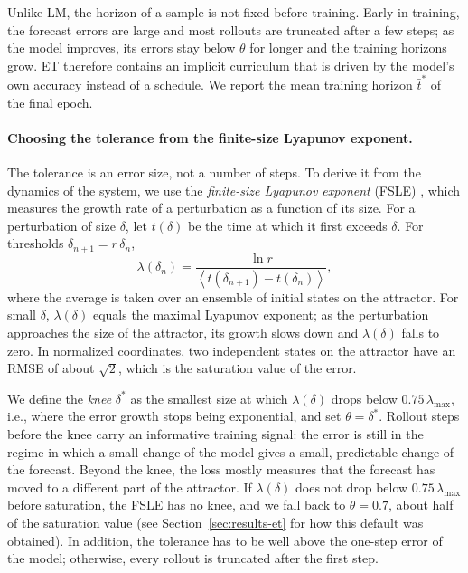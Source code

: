 \documentclass{article}
\begin{document}
Unlike LM, the horizon of a sample is not fixed before training. Early in training, the forecast errors are large and most rollouts are truncated after a few steps; as the model improves, its errors stay below $\theta$ for longer and the training horizons grow. ET therefore contains an implicit curriculum that is driven by the model's own accuracy instead of a schedule. We report the mean training horizon $\bar t^*$ of the final epoch.

\paragraph{Choosing the tolerance from the finite-size Lyapunov exponent.}
The tolerance is an error size, not a number of steps. To derive it from the dynamics of the system, we use the \emph{finite-size Lyapunov exponent} (FSLE) \cite{aurell_predictability_1997}, which measures the growth rate of a perturbation as a function of its size. For a perturbation of size $\delta$, let $t(\delta)$ be the time at which it first exceeds $\delta$. For thresholds $\delta_{n+1} = r\,\delta_n$,
\[
\lambda(\delta_n) = \frac{\ln r}{\left\langle t(\delta_{n+1}) - t(\delta_n) \right\rangle},
\]
where the average is taken over an ensemble of initial states on the attractor. For small $\delta$, $\lambda(\delta)$ equals the maximal Lyapunov exponent; as the perturbation approaches the size of the attractor, its growth slows down and $\lambda(\delta)$ falls to zero. In normalized coordinates, two independent states on the attractor have an RMSE of about $\sqrt{2}$, which is the saturation value of the error.

We define the \emph{knee} $\delta^*$ as the smallest size at which $\lambda(\delta)$ drops below $0.75\,\lambda_{\max}$, i.e., where the error growth stops being exponential, and set $\theta = \delta^*$. Rollout steps before the knee carry an informative training signal: the error is still in the regime in which a small change of the model gives a small, predictable change of the forecast. Beyond the knee, the loss mostly measures that the forecast has moved to a different part of the attractor. If $\lambda(\delta)$ does not drop below $0.75\,\lambda_{\max}$ before saturation, the FSLE has no knee, and we fall back to $\theta = 0.7$, about half of the saturation value (see Section~\ref{sec:results-et} for how this default was obtained). In addition, the tolerance has to be well above the one-step error of the model; otherwise, every rollout is truncated after the first step.
\end{document}
